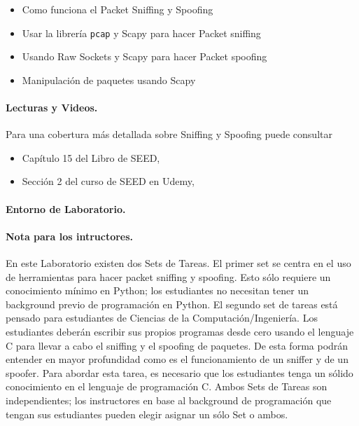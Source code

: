 \begin{itemize}[noitemsep]
\item Como funciona el Packet Sniffing y Spoofing
\item Usar la librería {\tt pcap} y Scapy para hacer Packet sniffing
\item Usando Raw Sockets y Scapy para hacer Packet spoofing 
\item Manipulación de paquetes usando Scapy
\end{itemize}



\paragraph{Lecturas y Videos.}
Para una cobertura más detallada sobre Sniffing y Spoofing puede consultar


\begin{itemize}
\item Capítulo 15 del Libro de SEED, \seedbook
\item Sección 2 del curso de SEED en Udemy, \seedisvideo
\end{itemize}



\paragraph{Entorno de Laboratorio.} \seedenvironmentC



\paragraph{Nota para los intructores.}
En este Laboratorio existen dos Sets de Tareas. El primer set se centra en el uso de herramientas para hacer packet sniffing y spoofing. Esto sólo requiere un conocimiento mínimo en Python; los estudiantes no necesitan tener un background previo de programación en Python.
El segundo set de tareas está pensado para estudiantes de Ciencias de la Computación/Ingeniería. 
Los estudiantes deberán escribir sus propios programas desde cero usando el lenguaje C para llevar a cabo el sniffing y el spoofing de paquetes. De esta forma podrán entender en mayor profundidad como es el funcionamiento de un sniffer y de un spoofer. Para abordar esta tarea, es necesario que los estudiantes tenga un sólido conocimiento en el lenguaje de programación C.
Ambos Sets de Tareas son independientes; los instructores en base al background de programación que tengan sus estudiantes pueden elegir asignar un sólo Set o ambos.



